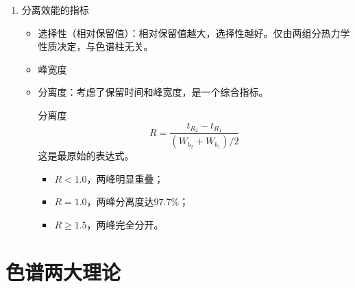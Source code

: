 \begin{enumerate}
	分配系数$K$：一定$T$、$p$，两相达平衡后，组分在固定相和流动相\footnote{流动相：moving phase；固定相：stationary phase}质量体积浓度的比值。	
	\begin{equation*}
		K=\dfrac{C_s}{C_m}
	\end{equation*}
	
	分配比$k$：一定$T$、$p$，两相达平衡后，组分在固定相质量（$p$）和流动相质量（$q$）的比值。
	\begin{equation*}
		k=\dfrac{p}{q}
	\end{equation*}
	
	$K$与$k$的关系\footnote{都是对于单个物质而言}：
	\begin{equation*}
		K=\dfrac{C_s}{C_m} =\dfrac{p/ V_s}{q/ V_M}=k \dfrac{V_0}{V_s}
	\end{equation*}
	\begin{theorem*}{$k$与保留值的关系}{}
		\begin{gather*}
			k=\dfrac{t'_R}{t_0} =\dfrac{t_R-t_0}{t_0}\\
			t_R=t_0 (1+k)		
		\end{gather*}
	\end{theorem*}
	
	\item 分离效能的指标
	\begin{itemize}
		\item 选择性（相对保留值）：相对保留值越大，选择性越好。仅由两组分热力学性质决定，与色谱柱无关。
		\item 峰宽度
		\item 分离度：考虑了保留时间和峰宽度，是一个综合指标。
		\begin{theorem*}{分离度}{}
			\begin{equation}
				R=\dfrac{t_{R_2}-t_{R_1}}{(W_{b_2}+W_{b_1})/2}\label{eqn:1.1}
			\end{equation}
			这是最原始的表达式。
		\end{theorem*}
		
		
		\begin{itemize}
			\item $R<1.0$，两峰明显重叠；
			\item $R=1.0$，两峰分离度达$97.7\%$；
			\item $R\geqslant 1.5$，两峰完全分开。
		\end{itemize}
	\end{itemize}
\end{enumerate}

\section{色谱两大理论}

